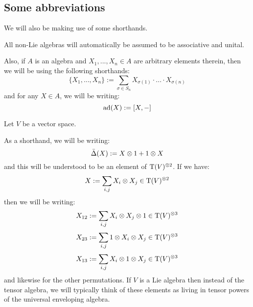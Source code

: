    \subsection{Some abbreviations}
        We will also be making use of some shorthands.
        \begin{convention}
            All non-Lie algebras will automatically be assumed to be associative and unital. 
    
            Also, if $A$ is an algebra and $X_1, ..., X_n \in A$ are arbitrary elements therein, then we will be using the following shorthands:
                $$\{ X_1, ..., X_n \} := \sum_{\sigma \in S_n} X_{\sigma(1)} \cdot ... \cdot X_{\sigma(n)}$$
            and for any $X \in A$, we will be writing:
                $$\mathrm{ad}(X) := [X, -]$$
        \end{convention}
        \begin{convention}
            Let $V$ be a vector space.
        
            As a shorthand, we will be writing:
                $$\bar{\Delta}(X) := X \tensor 1 + 1 \tensor X$$
            and this will be understood to be an element of $\rmT(V)^{\tensor 2}$. If we have:
                $$X := \sum_{i, j} X_i \tensor X_j \in \rmT(V)^{\tensor 2}$$
            then we will be writing:
                $$X_{12} := \sum_{i, j} X_i \tensor X_j \tensor 1 \in \rmT(V)^{\tensor 3}$$
                $$X_{23} := \sum_{i, j} 1 \tensor X_i \tensor X_j \in \rmT(V)^{\tensor 3}$$
                $$X_{13} := \sum_{i, j} X_i \tensor 1 \tensor X_j \in \rmT(V)^{\tensor 3}$$
            and likewise for the other permutations. If $V$ is a Lie algebra then instead of the tensor algebra, we will typically think of these elements as living in tensor powers of the universal enveloping algebra.
        \end{convention}